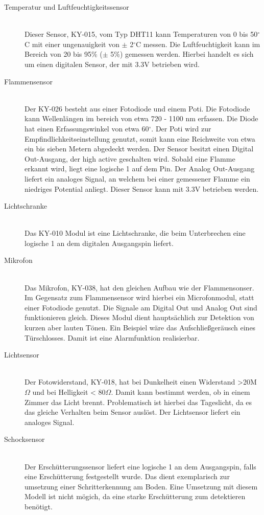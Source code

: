 \begin{description}
\item[Temperatur und Luftfeuchtigkeitssensor] \hfill \\
	Dieser Sensor, KY-015, vom Typ DHT11 kann Temperaturen von 0 bis 50$^\circ$C mit einer ungenauigkeit von $\pm$ 2$^\circ$C messen. Die Luftfeuchtigkeit kann im Bereich von 20 bis 95\% ($\pm$ 5\%) gemessen werden. Hierbei handelt es sich um einen digitalen Sensor, der mit 3.3V betrieben wird.  
\item[Flammensensor]\hfill \\
	Der KY-026 besteht aus einer Fotodiode und einem \ac{Poti}. Die Fotodiode kann Wellenlängen im bereich von etwa 720 - 1100 nm erfassen. Die Diode hat einen Erfassungswinkel von etwa 60$^\circ$. Der \ac{Poti} wird zur Empfindlichkeitseinstellung genutzt, somit kann eine Reichweite von etwa  ein bis sieben Metern abgedeckt werden. Der Sensor besitzt einen Digital Out-Ausgang, der high active geschalten wird. Sobald eine Flamme erkannt wird, liegt eine logische 1 auf dem Pin. Der Analog Out-Ausgang liefert ein analoges Signal, an welchem bei einer gemessener Flamme ein niedriges Potential anliegt. Dieser Sensor kann mit 3.3V betrieben werden.
\item[Lichtschranke]\hfill \\
	Das KY-010 Modul ist eine Lichtschranke, die beim Unterbrechen eine logische 1 an dem digitalen Ausgangspin liefert.
\item[Mikrofon]\hfill \\
	Das Mikrofon, KY-038, hat den gleichen Aufbau wie der Flammensonser. Im Gegensatz zum Flammensensor wird hierbei ein Microfonmodul, statt einer Fotodiode genutzt. Die Signale am Digital Out und Analog Out sind funktionieren gleich. Dieses Modul dient hauptsächlich zur Detektion von kurzen aber lauten Tönen. Ein Beispiel wäre das Aufschließgeräusch eines Türschlosses. Damit ist eine Alarmfunktion realisierbar.
\item[Lichtsensor]\hfill \\
	Der Fotowiderstand, KY-018, hat bei Dunkelheit einen Widerstand >20M$\Omega$ und bei Helligkeit < 80$\Omega$. Damit kann bestimmt werden, ob in einem Zimmer das Licht brennt. Problematisch ist hierbei das Tageslicht, da es das gleiche Verhalten beim Sensor auslöst. Der Lichtsensor liefert ein analoges Signal.
\item[Schocksensor]\hfill \\
	Der Erschütterungssensor liefert eine logische 1 an dem Ausgangspin, falls eine Erschütterung festgestellt wurde. Das dient exemplarisch zur umsetzung einer Schritterkennung am Boden. Eine Umsetzung mit diesem Modell ist nicht mögich, da eine starke Erschütterung zum detektieren benötigt.
\end{description}